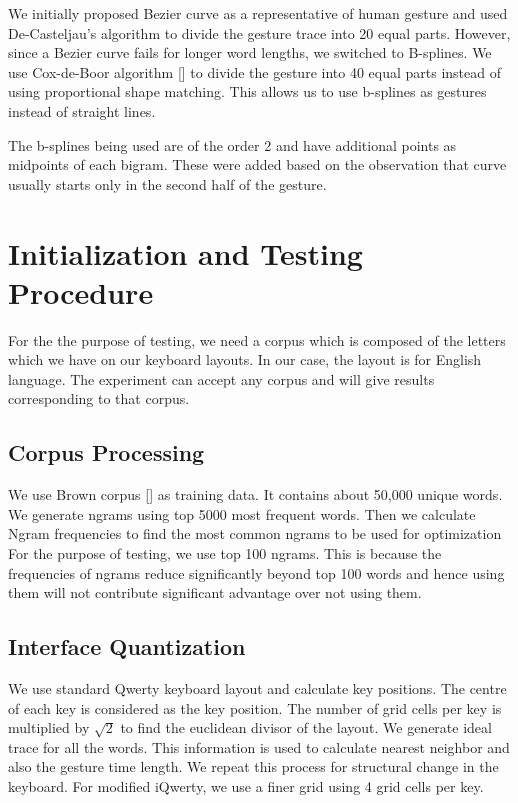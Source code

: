 \documentclass[MTech]{iitmdiss}
\begin{document}
We initially proposed Bezier curve as a representative of human gesture and used De-Casteljau's algorithm to divide the gesture trace into 20 equal parts. However, since a Bezier curve fails for longer word lengths, we switched to B-splines.
We use Cox-de-Boor algorithm [\cite{deboor}] to divide the gesture into 40 equal parts instead of using proportional shape matching. This allows us to use b-splines as gestures instead of straight lines.

The b-splines being used are of the order 2 and have additional points as midpoints of each bigram. These were added based on the observation that curve usually starts only in the second half of the gesture.

\chapter{Initialization and Testing Procedure}
For the the purpose of testing, we need a corpus which is composed of the letters which we have on our keyboard layouts. In our case, the layout is for English language. The experiment can accept any corpus and will give results corresponding to that corpus.

\section{Corpus Processing}
We use Brown corpus [\cite{brown}] as training data. It contains about 50,000 unique words.
We generate ngrams using top 5000 most frequent words.
Then we calculate Ngram frequencies to find the most common ngrams to be used for optimization For the purpose of testing, we use top 100 ngrams. This is because the frequencies of ngrams reduce significantly beyond top 100 words and hence using them will not contribute significant advantage over not using them.

\section{Interface Quantization}
We use standard Qwerty keyboard layout and calculate key positions.
The centre of each key is considered as the key position.
The number of grid cells per key is multiplied by $\sqrt{2}$ to find the euclidean divisor of the layout.
We generate ideal trace for all the words. 
This information is used to calculate nearest neighbor and also the gesture time length.
We repeat this process for structural change in the keyboard. For modified iQwerty, we use a finer grid using 4 grid cells per key.
\end{document}
